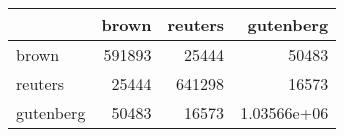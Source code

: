 \begin{tabular}{lrrr}
\hline
           &   brown &   reuters &       gutenberg \\
\hline
 brown     &  591893 &     25444 & 50483           \\
 reuters   &   25444 &    641298 & 16573           \\
 gutenberg &   50483 &     16573 &     1.03566e+06 \\
\hline
\end{tabular}